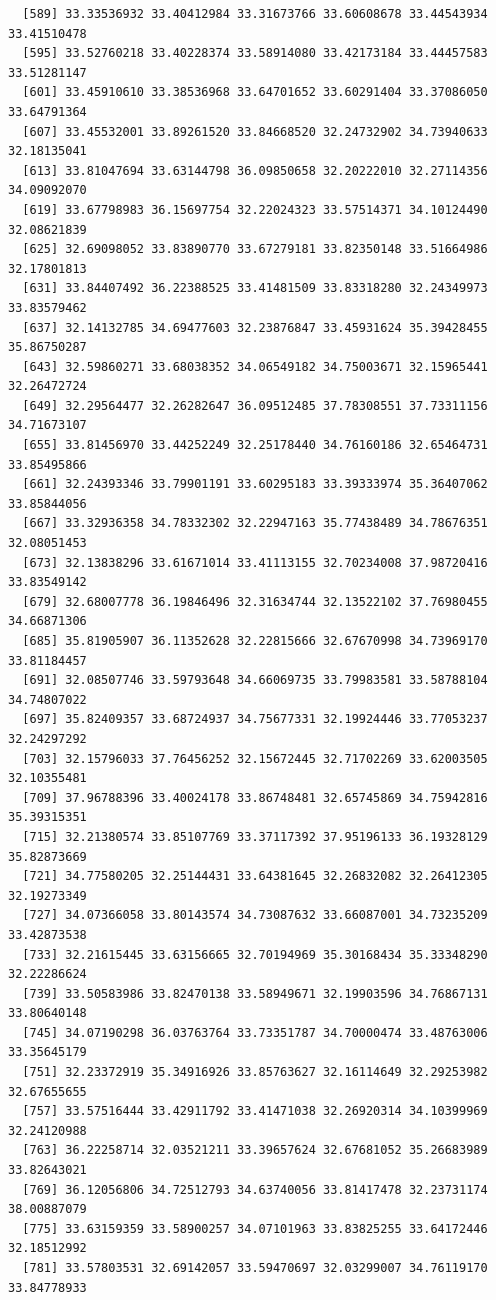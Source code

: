 \documentclass[
  letterpaper,
  DIV=11,
  numbers=noendperiod]{scrartcl}
\begin{document}
\begin{verbatim}
  [589] 33.33536932 33.40412984 33.31673766 33.60608678 33.44543934 33.41510478
  [595] 33.52760218 33.40228374 33.58914080 33.42173184 33.44457583 33.51281147
  [601] 33.45910610 33.38536968 33.64701652 33.60291404 33.37086050 33.64791364
  [607] 33.45532001 33.89261520 33.84668520 32.24732902 34.73940633 32.18135041
  [613] 33.81047694 33.63144798 36.09850658 32.20222010 32.27114356 34.09092070
  [619] 33.67798983 36.15697754 32.22024323 33.57514371 34.10124490 32.08621839
  [625] 32.69098052 33.83890770 33.67279181 33.82350148 33.51664986 32.17801813
  [631] 33.84407492 36.22388525 33.41481509 33.83318280 32.24349973 33.83579462
  [637] 32.14132785 34.69477603 32.23876847 33.45931624 35.39428455 35.86750287
  [643] 32.59860271 33.68038352 34.06549182 34.75003671 32.15965441 32.26472724
  [649] 32.29564477 32.26282647 36.09512485 37.78308551 37.73311156 34.71673107
  [655] 33.81456970 33.44252249 32.25178440 34.76160186 32.65464731 33.85495866
  [661] 32.24393346 33.79901191 33.60295183 33.39333974 35.36407062 33.85844056
  [667] 33.32936358 34.78332302 32.22947163 35.77438489 34.78676351 32.08051453
  [673] 32.13838296 33.61671014 33.41113155 32.70234008 37.98720416 33.83549142
  [679] 32.68007778 36.19846496 32.31634744 32.13522102 37.76980455 34.66871306
  [685] 35.81905907 36.11352628 32.22815666 32.67670998 34.73969170 33.81184457
  [691] 32.08507746 33.59793648 34.66069735 33.79983581 33.58788104 34.74807022
  [697] 35.82409357 33.68724937 34.75677331 32.19924446 33.77053237 32.24297292
  [703] 32.15796033 37.76456252 32.15672445 32.71702269 33.62003505 32.10355481
  [709] 37.96788396 33.40024178 33.86748481 32.65745869 34.75942816 35.39315351
  [715] 32.21380574 33.85107769 33.37117392 37.95196133 36.19328129 35.82873669
  [721] 34.77580205 32.25144431 33.64381645 32.26832082 32.26412305 32.19273349
  [727] 34.07366058 33.80143574 34.73087632 33.66087001 34.73235209 33.42873538
  [733] 32.21615445 33.63156665 32.70194969 35.30168434 35.33348290 32.22286624
  [739] 33.50583986 33.82470138 33.58949671 32.19903596 34.76867131 33.80640148
  [745] 34.07190298 36.03763764 33.73351787 34.70000474 33.48763006 33.35645179
  [751] 32.23372919 35.34916926 33.85763627 32.16114649 32.29253982 32.67655655
  [757] 33.57516444 33.42911792 33.41471038 32.26920314 34.10399969 32.24120988
  [763] 36.22258714 32.03521211 33.39657624 32.67681052 35.26683989 33.82643021
  [769] 36.12056806 34.72512793 34.63740056 33.81417478 32.23731174 38.00887079
  [775] 33.63159359 33.58900257 34.07101963 33.83825255 33.64172446 32.18512992
  [781] 33.57803531 32.69142057 33.59470697 32.03299007 34.76119170 33.84778933

\end{verbatim}
\end{document}
